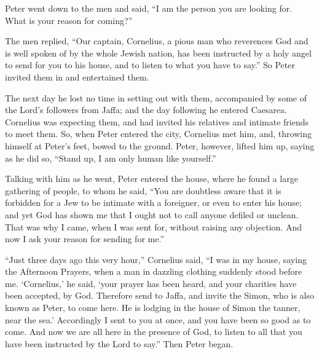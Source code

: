  Peter went down to the men and said, ``I am the person you
are looking for. What is your reason for coming?''

 The men replied, ``Our captain, Cornelius, a pious man who
reverences God and is well spoken of by the whole Jewish nation, has
been instructed by a holy angel to send for you to his house, and to
listen to what you have to say.''  So Peter invited them in
and entertained them.

The next day he lost no time in setting out with them, accompanied by
some of the Lord's followers from Jaffa;  and the day
following he entered Caesarea. Cornelius was expecting them, and had
invited his relatives and intimate friends to meet them. 
So, when Peter entered the city, Cornelius met him, and, throwing
himself at Peter's feet, bowed to the ground.  Peter,
however, lifted him up, saying as he did so, ``Stand up, I am only human
like yourself.''

 Talking with him as he went, Peter entered the house,
where he found a large gathering of people, to whom he said,
 ``You are doubtless aware that it is forbidden for a Jew
to be intimate with a foreigner, or even to enter his house; and yet God
has shown me that I ought not to call anyone defiled or unclean.
 That was why I came, when I was sent for, without raising
any objection. And now I ask your reason for sending for me.''

 ``Just three days ago this very hour,'' Cornelius said,
``I was in my house, saying the Afternoon Prayers, when a man in
dazzling clothing suddenly stood before me.  `Cornelius,'
he said, `your prayer has been heard, and your charities have been
accepted, by God.  Therefore send to Jaffa, and invite the
Simon, who is also known as Peter, to come here. He is lodging in the
house of Simon the tanner, near the sea.'  Accordingly I
sent to you at once, and you have been so good as to come. And now we
are all here in the presence of God, to listen to all that you have been
instructed by the Lord to say.''  Then Peter began.

